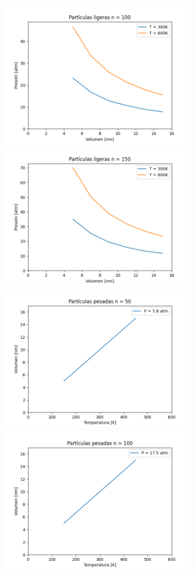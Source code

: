 \documentclass[a4paper, 12p]{article}
\begin{document}
\begin{figure}[H]
\begin{subfigure}
    	\end{subfigure}
    	\begin{subfigure}
    		\raggedright
    		\includegraphics[width=8cm, height=6cm]{graficos/grafico5.pdf}
    	\end{subfigure}
    	\begin{subfigure}
    		\raggedright
    		\includegraphics[width=8cm, height=6cm]{graficos/grafico6.pdf}
    	\end{subfigure}
    	\begin{subfigure}
    		\raggedright
    		\includegraphics[width=8cm, height=6cm]{graficos/grafico7.pdf}
    	\end{subfigure}
    	\begin{subfigure}
    		\raggedright
    		\includegraphics[width=8cm, height=6cm]{graficos/grafico8.pdf}
    	\end{subfigure}
\end{figure}   
\end{document}
